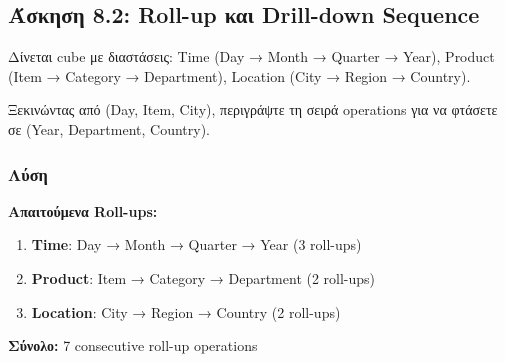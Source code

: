 \subsection{Άσκηση 8.2: Roll-up και Drill-down Sequence}

\begin{formulabox}[Εκφώνηση]
Δίνεται cube με διαστάσεις: Time (Day → Month → Quarter → Year),
Product (Item → Category → Department), Location (City → Region → Country).

Ξεκινώντας από (Day, Item, City), περιγράψτε τη σειρά operations για να φτάσετε σε
(Year, Department, Country).
\end{formulabox}

\subsubsection*{Λύση}

\textbf{Απαιτούμενα Roll-ups:}

\begin{enumerate}
    \item \textbf{Time}: Day → Month → Quarter → Year (3 roll-ups)
    \item \textbf{Product}: Item → Category → Department (2 roll-ups)
    \item \textbf{Location}: City → Region → Country (2 roll-ups)
\end{enumerate}

\textbf{Σύνολο:} 7 consecutive roll-up operations

\begin{center}
\end{center}

